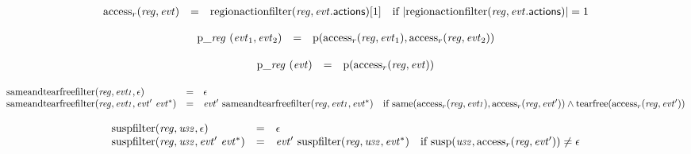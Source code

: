 $$
\begin{array}[t]{@{}lcl@{}l@{}}
{\mathrm{access}}_r({\mathit{reg}}, {\mathit{evt}}) & = & {\mathrm{regionactionfilter}}({\mathit{reg}}, {\mathit{evt}}{.}\mathsf{actions}){}[1] & \quad \mbox{if}~ {|{\mathrm{regionactionfilter}}({\mathit{reg}}, {\mathit{evt}}{.}\mathsf{actions})|} = 1 \\
\end{array}
$$

$$
\begin{array}[t]{@{}lcl@{}l@{}}
{{\mathrm{p}}}{\mathsf{\_}}{{\mathit{reg}}}~({\mathit{evt}}_1, {\mathit{evt}}_2) & = & {\mathrm{p}}({\mathrm{access}}_r({\mathit{reg}}, {\mathit{evt}}_1), {\mathrm{access}}_r({\mathit{reg}}, {\mathit{evt}}_2)) \\
\end{array}
$$

$$
\begin{array}[t]{@{}lcl@{}l@{}}
{{\mathrm{p}}}{\mathsf{\_}}{{\mathit{reg}}}~({\mathit{evt}}) & = & {\mathrm{p}}({\mathrm{access}}_r({\mathit{reg}}, {\mathit{evt}})) \\
\end{array}
$$

$$
\begin{array}[t]{@{}lcl@{}l@{}}
{\mathrm{sameandtearfreefilter}}({\mathit{reg}}, {\mathit{evt{\kern-0.1em\scriptstyle 1}}}, \epsilon) & = & \epsilon \\
{\mathrm{sameandtearfreefilter}}({\mathit{reg}}, {\mathit{evt{\kern-0.1em\scriptstyle 1}}}, {\mathit{evt}'}~{{\mathit{evt}}^\ast}) & = & {\mathit{evt}'}~{\mathrm{sameandtearfreefilter}}({\mathit{reg}}, {\mathit{evt{\kern-0.1em\scriptstyle 1}}}, {{\mathit{evt}}^\ast}) & \quad \mbox{if}~ {\mathrm{same}}({\mathrm{access}}_r({\mathit{reg}}, {\mathit{evt{\kern-0.1em\scriptstyle 1}}}), {\mathrm{access}}_r({\mathit{reg}}, {\mathit{evt}'})) \land {\mathrm{tearfree}}({\mathrm{access}}_r({\mathit{reg}}, {\mathit{evt}'})) \\
\end{array}
$$

$$
\begin{array}[t]{@{}lcl@{}l@{}}
{\mathrm{suspfilter}}({\mathit{reg}}, {\mathit{u{\kern-0.1em\scriptstyle 32}}}, \epsilon) & = & \epsilon \\
{\mathrm{suspfilter}}({\mathit{reg}}, {\mathit{u{\kern-0.1em\scriptstyle 32}}}, {\mathit{evt}'}~{{\mathit{evt}}^\ast}) & = & {\mathit{evt}'}~{\mathrm{suspfilter}}({\mathit{reg}}, {\mathit{u{\kern-0.1em\scriptstyle 32}}}, {{\mathit{evt}}^\ast}) & \quad \mbox{if}~ {\mathrm{susp}}({\mathit{u{\kern-0.1em\scriptstyle 32}}}, {\mathrm{access}}_r({\mathit{reg}}, {\mathit{evt}'})) \neq \epsilon \\
\end{array}
$$

